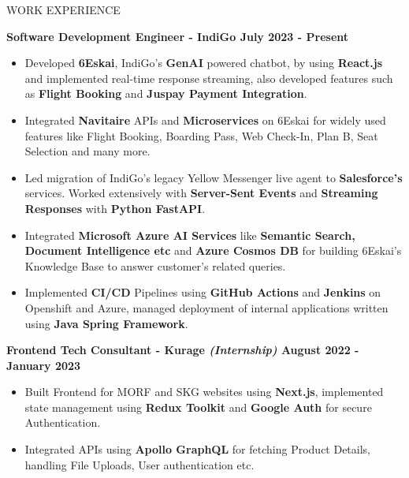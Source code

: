 \documentclass{resume} %
\begin{document}
\begin{rSection}{WORK EXPERIENCE}

{\bf Software Development Engineer - IndiGo  \hfill July 2023 - Present }
\begin{itemize}
    \item {\normalfont Developed \textbf{6Eskai}, IndiGo's \textbf{GenAI} powered chatbot, by using \textbf{React.js} and implemented real-time response streaming, also developed features such as \textbf{Flight Booking} and \textbf{Juspay Payment Integration}.}
    \item{\normalfont Integrated \textbf{Navitaire} APIs and \textbf{Microservices} on 6Eskai for widely used features like Flight Booking, Boarding Pass, Web Check-In, Plan B, Seat Selection and many more.}
    \item {\normalfont Led migration of IndiGo's legacy Yellow Messenger live agent to \textbf{Salesforce's} services. Worked extensively with \textbf{Server-Sent Events} and \textbf{Streaming Responses} with \textbf{Python FastAPI}.}
    \item {\normalfont Integrated \textbf{Microsoft Azure AI Services} like \textbf{Semantic Search, Document Intelligence etc} and \textbf{Azure Cosmos DB} for building 6Eskai's Knowledge Base to answer customer's related queries.}
    \item {\normalfont Implemented \textbf{CI/CD} Pipelines using \textbf{GitHub Actions} and \textbf{Jenkins} on Openshift and Azure, managed deployment of internal applications written using \textbf{Java Spring Framework}.}
\end{itemize}


{\bf Frontend Tech Consultant - Kurage {\normalfont \emph{(Internship)}}  \hfill August 2022 - January 2023 }
\begin{itemize}

    \item {\normalfont Built Frontend for MORF and SKG websites using \textbf{Next.js}, implemented state management using 
 \textbf{Redux Toolkit} and \textbf{Google Auth} for secure Authentication.}
   \item {\normalfont Integrated APIs using \textbf{{Apollo GraphQL}} for fetching Product Details, handling File Uploads, User authentication etc.} 
\end{itemize}

\end{rSection}


\end{document}

